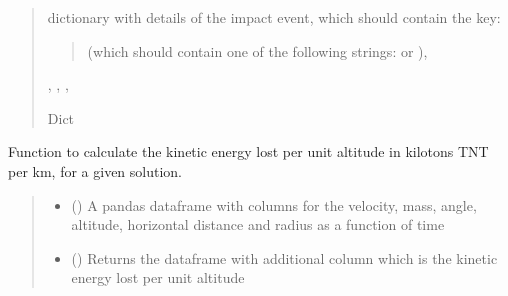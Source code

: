 \documentclass[letterpaper,10pt,english]{sphinxmanual}
\begin{document}
\begin{fulllineitems}
\begin{fulllineitems}
\begin{quote}
\begin{description}
\sphinxAtStartPar

\sphinxAtStartPar
{} \textendash{} dictionary with details of the impact event, which should contain
the key:
\begin{quote}

\sphinxAtStartPar
{} (which should contain one of the
following strings:  or ),
\end{quote}
\begin{description}
\sphinxAtStartPar
{}, ,
, 

\end{description}


\sphinxAtStartPar
Dict

\end{description}\end{quote}

\end{fulllineitems}


\begin{fulllineitems}
\label{\detokenize{index:solver.Planet.calculate_energy}}
\pysigstartsignatures
{}
\pysigstopsignatures
\sphinxAtStartPar
Function to calculate the kinetic energy lost per unit altitude in
kilotons TNT per km, for a given solution.
\begin{quote}\begin{description}
\begin{itemize}
\item {} 
\sphinxAtStartPar
{} () \textendash{} A pandas dataframe with columns for the velocity, mass, angle,
altitude, horizontal distance and radius as a function of time

\item {} 
\sphinxAtStartPar
{} () \textendash{} Returns the dataframe with additional column  which is the
kinetic energy lost per unit altitude


\end{itemize}
\end{description}
\end{quote}
\end{fulllineitems}
\end{fulllineitems}
\end{document}
